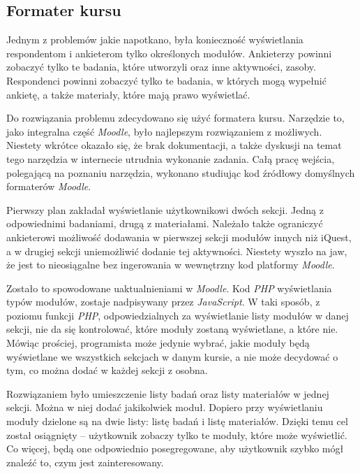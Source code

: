 \subsection{Formater kursu}
Jednym z problemów jakie napotkano, była konieczność wyświetlania respondentom i ankieterom tylko określonych modułów. Ankieterzy powinni zobaczyć tylko te badania, które utworzyli oraz inne aktywności, zasoby. Respondenci powinni zobaczyć tylko te badania, w których mogą wypełnić ankietę, a także materiały, które mają prawo wyświetlać.

Do rozwiązania problemu zdecydowano się użyć formatera kursu. Narzędzie to, jako integralna część \emph{Moodle}, było najlepszym rozwiązaniem z możliwych. Niestety wkrótce okazało się, że brak dokumentacji, a także dyskusji na temat tego narzędzia w internecie utrudnia wykonanie zadania. Całą pracę wejścia, polegającą na poznaniu narzędzia, wykonano studiując kod źródłowy domyślnych formaterów \emph{Moodle}.

Pierwszy plan zakładał wyświetlanie użytkownikowi dwóch sekcji. Jedną z odpowiednimi badaniami, drugą z materiałami. Należało także ograniczyć ankieterowi możliwość dodawania w pierwszej sekcji modułów innych niż iQuest, a w drugiej sekcji uniemożliwić dodanie tej aktywności. Niestety wyszło na jaw, że jest to nieosiągalne bez ingerowania w wewnętrzny kod platformy \emph{Moodle}. 

Zostało to spowodowane uaktualnieniami w \emph{Moodle}. Kod \emph{PHP} wyświetlania typów modułów, zostaje nadpisywany przez \emph{JavaScript}. W taki sposób, z poziomu funkcji \emph{PHP}, odpowiedzialnych za wyświetlanie listy modułów w danej sekcji, nie da się kontrolować, które moduły zostaną wyświetlane, a które nie. Mówiąc prościej, programista może jedynie wybrać, jakie moduły będą wyświetlane we wszystkich sekcjach w danym kursie, a nie może decydować o tym, co można dodać w każdej sekcji z osobna.

Rozwiązaniem było umieszczenie listy badań oraz listy materiałów w jednej sekcji. Można w niej dodać jakikolwiek moduł. Dopiero przy wyświetlaniu moduły dzielone są na dwie listy: listę badań i listę materiałów. Dzięki temu cel został osiągnięty -- użytkownik zobaczy tylko te moduły, które może wyświetlić. Co więcej, będą one odpowiednio posegregowane, aby użytkownik szybko mógł znaleźć to, czym jest zainteresowany.

